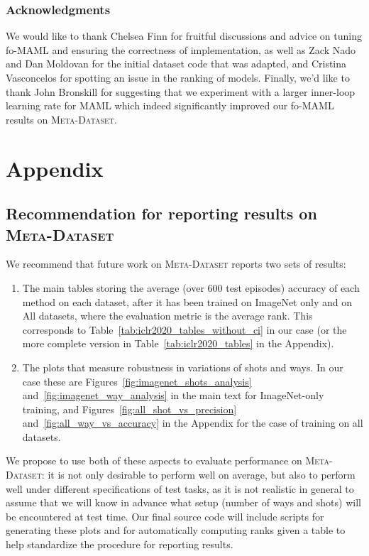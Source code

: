 \documentclass{article} \usepackage{iclr2020_conference,times}
\newcommand{\benchmark}{\textsc{Meta-Dataset}\xspace}
\begin{document}
\subsubsection*{Acknowledgments}

We would like to thank Chelsea Finn for fruitful discussions and
advice on tuning fo-MAML and ensuring the correctness of implementation, as
well as Zack Nado and Dan Moldovan for the initial dataset code that was
adapted, and Cristina Vasconcelos for spotting an issue in the ranking of models.
Finally, we'd like to thank John Bronskill for suggesting that we
experiment with a larger inner-loop learning rate for MAML which indeed
significantly improved our fo-MAML results on \benchmark.
\fi

\newpage




\newpage

\appendix
\section*{Appendix}

\subsection{Recommendation for reporting results on \benchmark}
We recommend that future work on \benchmark reports two sets of results:
\begin{enumerate}
	\item The main tables storing the average (over 600 test episodes) accuracy of each method on each dataset, after it has been trained on ImageNet only and on All datasets, where the evaluation metric is the average rank. This corresponds to Table~\ref{tab:iclr2020_tables_without_ci} in our case (or the more complete version in Table~\ref{tab:iclr2020_tables} in the Appendix).
	\item The plots that measure robustness in variations of shots and ways. In our case these are Figures~\ref{fig:imagenet_shots_analysis} and~\ref{fig:imagenet_way_analysis} in the main text for ImageNet-only training, and Figures~\ref{fig:all_shot_vs_precision} and~\ref{fig:all_way_vs_accuracy} in the Appendix for the case of training on all datasets.
\end{enumerate}
We propose to use both of these aspects to evaluate performance on \benchmark: it is not only desirable to perform well on average, but also to perform well under different specifications of test tasks, as it is not realistic in general to assume that we will know in advance what setup (number of ways and shots) will be encountered at test time. 
Our final source code will include scripts for generating these plots and for automatically computing ranks given a table to help standardize the procedure for reporting results.
\end{document}
